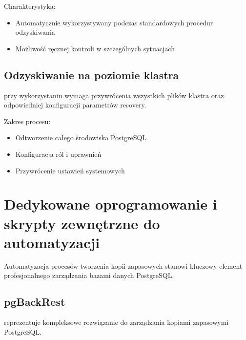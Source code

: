 \documentclass[a4paper,11pt,polish]{sphinxmanual}
\begin{document}
\sphinxAtStartPar
Charakterystyka:
\begin{itemize}
\item {} 
\sphinxAtStartPar
Automatycznie wykorzystywany podczas standardowych procedur odzyskiwania

\item {} 
\sphinxAtStartPar
Możliwość ręcznej kontroli w szczególnych sytuacjach

\end{itemize}


\subsection{Odzyskiwanie na poziomie klastra}
\label{\detokenize{Kopie_zapasowe_i_odzyskiwanie_danych/kopie_zapasowe_i_odzyskiwanie_danych:odzyskiwanie-na-poziomie-klastra}}
\sphinxAtStartPar
{} przy wykorzystaniu  wymaga przywrócenia wszystkich plików klastra oraz odpowiedniej konfiguracji parametrów recovery.

\sphinxAtStartPar
Zakres procesu:
\begin{itemize}
\item {} 
\sphinxAtStartPar
Odtworzenie całego środowiska PostgreSQL

\item {} 
\sphinxAtStartPar
Konfiguracja ról i uprawnień

\item {} 
\sphinxAtStartPar
Przywrócenie ustawień systemowych

\end{itemize}


\section{Dedykowane oprogramowanie i skrypty zewnętrzne do automatyzacji}
\label{\detokenize{Kopie_zapasowe_i_odzyskiwanie_danych/kopie_zapasowe_i_odzyskiwanie_danych:dedykowane-oprogramowanie-i-skrypty-zewnetrzne-do-automatyzacji}}
\sphinxAtStartPar
Automatyzacja procesów tworzenia kopii zapasowych stanowi kluczowy element profesjonalnego zarządzania bazami danych PostgreSQL.


\subsection{pgBackRest}
\label{\detokenize{Kopie_zapasowe_i_odzyskiwanie_danych/kopie_zapasowe_i_odzyskiwanie_danych:pgbackrest}}
\sphinxAtStartPar
{} reprezentuje kompleksowe rozwiązanie do zarządzania kopiami zapasowymi PostgreSQL.
\end{document}
